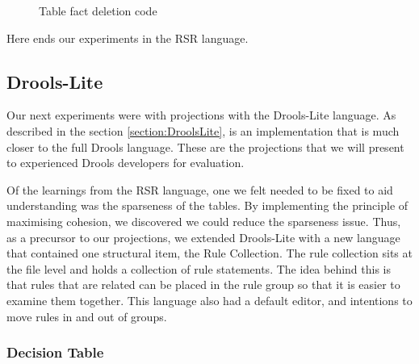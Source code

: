 \begin{figure}[h]
    \centering
    \caption{Table fact deletion code}
    \label{fig:tableFactDeletion}
\end{figure}

Here ends our experiments in the RSR language.

\subsection{Drools-Lite}

Our next experiments were with projections with the Drools-Lite language.
As described in the section \ref{section:DroolsLite}, is an implementation that is much closer to the full Drools language.
These are the projections that we will present to experienced Drools developers for evaluation.

Of the learnings from the RSR language, one we felt needed to be fixed to aid understanding was the sparseness of the tables.
By implementing the principle of maximising cohesion, we discovered we could reduce the sparseness issue.
Thus, as a precursor to our projections, we extended Drools-Lite with a new language that contained one structural item, the Rule Collection.
The rule collection sits at the file level and holds a collection of rule statements.
The idea behind this is that rules that are related can be placed in the rule group so that it is easier to examine them together.
This language also had a default editor, and intentions to move rules in and out of groups.

\subsubsection{Decision Table}

